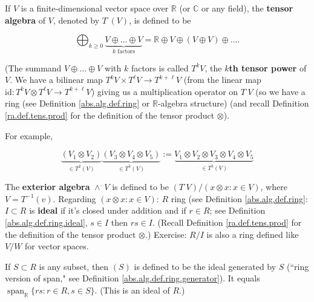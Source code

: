 \begin{definition}\label{ra.def.wedge.prod.gen}

If \(V\) is a finite-dimensional vector space over \(\mathbb{R}\) (or \(\mathbb{C}\) or any field), the \textbf{tensor algebra} of \(V\), denoted by \(T^\cdot(V)\), is defined to be 

\[
\bigoplus_{k \geq 0} \underbrace{V \oplus \ldots \oplus V}_{k \text{ factors}} = \mathbb{R} \oplus V \oplus (V \oplus V) \oplus \ldots .
\]

(The summand \(V \oplus \ldots \oplus V\) with \(k\) factors is called \(T^k V\), the \textbf{\(k\)th tensor power} of \(V\). We have a bilinear map \(T^k V \times T^\ell V \to T^{k + \ell } V\) (from the linear map \(\text{id}: T^k V \otimes T^\ell V \to T^{k + \ell}V\)) giving us a multiplication operator on \(T^\cdot V\) (so we have a ring (see Definition \ref{abs.alg.def.ring} or \(\mathbb{R}\)-algebra structure) (and recall Definition \ref{ra.def.tens.prod} for the definition of the tensor product \(\otimes\)). 

For example, 

\[
\underbrace{(V_1 \otimes V_2)}_{\in T^2(V)} \underbrace{(V_3 \otimes V_4 \otimes V_5)}_{\in T^3(V)} := \underbrace{V_1 \otimes V_2 \otimes V_3 \otimes V_4 \otimes V_5}_{\in T^5(V)}
\]

\end{definition}

\begin{definition}

The \textbf{exterior algebra} \(\wedge^\cdot V\) is defined to be \((T^\cdot V)/(x \otimes x: x \in V)\), where \(V = T^{-1}(v)\). Regarding \((x \otimes x: x \in V)\): \(R\) ring (see Definition \ref{abs.alg.def.ring}: \(I \subset  R\) is \textbf{ideal} if it's closed under addition and if \(r \in R\); see Definition \ref{abs.alg.def.ring.ideal}, \(s \in I\) then \(rs \in I\). (Recall Definition \ref{ra.def.tens.prod} for the definition of the tensor product \(\otimes\).) Exercise: \(R/I\) is also a ring defined like \(V/W\) for vector spaces. 

If \(S \subset R\) is any subset, then \((S)\) is defined to be the ideal generated by \(S\) (``ring version of span," see Definition \ref{abs.alg.def.ring.generator}). It equals \(\operatorname{span}_{\mathbb{R}}\{rs: r \in R, s \in S\}\). (This is an ideal of \(R\).)

\end{definition}

